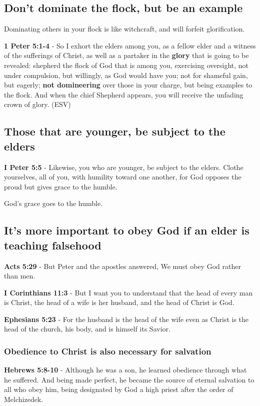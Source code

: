 \documentclass[11pt]{article}
\begin{document}
\subsection{Don't dominate the flock, but be an example}
\label{sec:org6a2dae8}
Dominating others in your flock is like witchcraft, and will forfeit glorification.

\textbf{1 Peter 5:1-4} -  So I exhort the elders among you, as a fellow elder and a witness of the sufferings of Christ, as well as a partaker in the \textbf{glory} that is going to be revealed: shepherd the flock of God that is among you, exercising oversight, not under compulsion, but willingly, as God would have you; not for shameful gain, but eagerly; \textbf{not domineering} over those in your charge, but being examples to the flock.  And when the chief Shepherd appears, you will receive the unfading crown of glory.  (ESV)

\subsection{Those that are younger, be subject to the elders}
\label{sec:org84b3200}
\textbf{I Peter 5:5} - Likewise, you who are younger, be subject to the elders. Clothe yourselves, all of you, with humility toward one another, for God opposes the proud but gives grace to the humble.

God's grace goes to the humble.

\subsection{It's more important to obey God if an elder is teaching falsehood}
\label{sec:orge04f87c}
\textbf{Acts 5:29} - But Peter and the apostles answered, We must obey God rather than men.

\textbf{I Corinthians 11:3} - But I want you to understand that the head of every man is Christ, the head of a wife is her husband, and the head of Christ is God.

\textbf{Ephesians 5:23} - For the husband is the head of the wife even as Christ is the head of the church, his body, and is himself its Savior.

\subsubsection{Obedience to Christ is also necessary for salvation}
\label{sec:orgbb5a4b3}
\textbf{Hebrews 5:8-10} - Although he was a son, he learned obedience through what he suffered.  And being made perfect, he became the source of eternal salvation to all who obey him, being designated by God a high priest after the order of Melchizedek.
\end{document}
